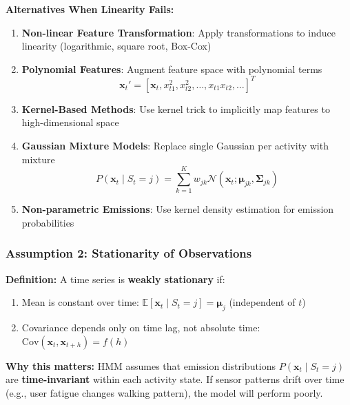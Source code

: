 \documentclass[11pt,a4paper]{article}
\newcommand{\E}{\mathbb{E}}
\newcommand{\bx}{\mathbf{x}}
\newcommand{\bmu}{\boldsymbol{\mu}}
\newcommand{\bSigma}{\boldsymbol{\Sigma}}
\begin{document}
\textbf{Alternatives When Linearity Fails:}

\begin{enumerate}[leftmargin=*]
    \item \textbf{Non-linear Feature Transformation}: Apply transformations to induce linearity (logarithmic, square root, Box-Cox)
    
    \item \textbf{Polynomial Features}: Augment feature space with polynomial terms
    \begin{equation}
    \bx_t' = [\bx_t, x_{t1}^2, x_{t2}^2, \ldots, x_{t1}x_{t2}, \ldots]^T
    \end{equation}
    
    \item \textbf{Kernel-Based Methods}: Use kernel trick to implicitly map features to high-dimensional space
    
    \item \textbf{Gaussian Mixture Models}: Replace single Gaussian per activity with mixture
    \begin{equation}
    P(\bx_t \mid S_t = j) = \sum_{k=1}^{K} w_{jk} \mathcal{N}(\bx_t; \bmu_{jk}, \bSigma_{jk})
    \end{equation}
    
    \item \textbf{Non-parametric Emissions}: Use kernel density estimation for emission probabilities
\end{enumerate}

\subsubsection{Assumption 2: Stationarity of Observations}

\textbf{Definition:} A time series is \textbf{weakly stationary} if:
\begin{enumerate}
    \item Mean is constant over time: $\E[\bx_t \mid S_t = j] = \bmu_j$ (independent of $t$)
    \item Covariance depends only on time lag, not absolute time: $\text{Cov}(\bx_t, \bx_{t+h}) = f(h)$
\end{enumerate}

\textbf{Why this matters:} HMM assumes that emission distributions $P(\bx_t \mid S_t = j)$ are \textbf{time-invariant} within each activity state. If sensor patterns drift over time (e.g., user fatigue changes walking pattern), the model will perform poorly.
\end{document}
